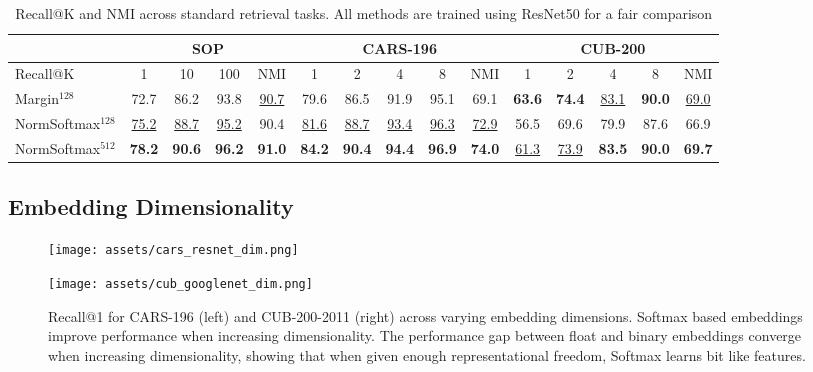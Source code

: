 \documentclass{bmvc2k}
\begin{document}
\begin{table*}
\begin{center}
{\begin{tabular}{l | c c c c | c c c c c | c c c c c }
\hline
 &  \multicolumn{4}{c}{SOP} &  \multicolumn{5}{c}{CARS-196} &  \multicolumn{5}{c}{CUB-200} \\
\hline
Recall@K &  1 & 10 & 100 & NMI & 1 & 2 & 4 & 8 & NMI & 1 & 2 &4 & 8 & NMI \\
\hline\hline
Margin$^{128}$~\cite{samplingmatters} & 72.7 & 86.2 & 93.8 & \underline{90.7} & 79.6 & 86.5 & 91.9 & 95.1 &  69.1  &  \textbf{63.6} & \textbf{74.4} & \underline{83.1} & \textbf{90.0} & \underline{69.0} \\ 
\hline
NormSoftmax$^{128}$  & \underline{75.2} & \underline{88.7} & \underline{95.2} & 90.4 & \underline{81.6} & \underline{88.7} & \underline{93.4} & \underline{96.3} & \underline{72.9} &  56.5 & 69.6 & 79.9 & 87.6 & 66.9 \\
NormSoftmax$^{512}$  & \textbf{78.2} & \textbf{90.6} & \textbf{96.2}  & \textbf{91.0}  & \textbf{84.2} & \textbf{90.4} & \textbf{94.4} & \textbf{96.9} & \textbf{74.0} & \underline{61.3} & \underline{73.9} & \textbf{83.5} & \textbf{90.0} & \textbf{69.7} \\
\end{tabular}
}
\caption{Recall@K and NMI across standard retrieval tasks. All methods are trained using ResNet50 for a fair comparison}
\label{tab:resnet50_loss}
\end{center}
\end{table*} \subsection{Embedding Dimensionality}
\label{sec:exp_dimension}




\begin{figure*}
\centering
\begin{minipage}{.45\textwidth}
  \centering
  \texttt{[image: assets/cars\_resnet\_dim.png]}
  \end{minipage}\begin{minipage}{.45\textwidth}
  \centering
  \texttt{[image: assets/cub\_googlenet\_dim.png]}
  \end{minipage}
   \caption{Recall@1 for CARS-196 (left) and CUB-200-2011 (right) across varying embedding dimensions. Softmax based embeddings improve performance when increasing dimensionality. The performance gap between float and binary embeddings converge when increasing dimensionality, showing that when given enough representational freedom, Softmax learns bit like features.}
   \label{fig:dim_trend}

\end{figure*}
\end{document}
